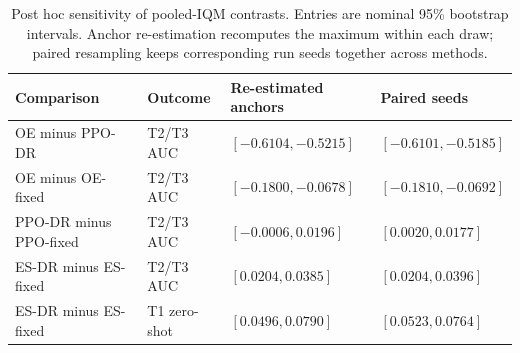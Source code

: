 \begin{table}[tb]
\centering\small
\caption{Post hoc sensitivity of pooled-IQM contrasts. Entries are nominal 95\% bootstrap intervals. Anchor re-estimation recomputes the maximum within each draw; paired resampling keeps corresponding run seeds together across methods.}\label{tab:sensitivity}
\begin{tabularx}{\linewidth}{P{3.4cm}P{2.0cm}P{4.1cm}P{4.1cm}}
\toprule
Comparison & Outcome & Re-estimated anchors & Paired seeds\\\midrule
OE minus PPO-DR & T2/T3 AUC & $[-0.6104,-0.5215]$ & $[-0.6101,-0.5185]$\\
OE minus OE-fixed & T2/T3 AUC & $[-0.1800,-0.0678]$ & $[-0.1810,-0.0692]$\\
PPO-DR minus PPO-fixed & T2/T3 AUC & $[-0.0006,0.0196]$ & $[0.0020,0.0177]$\\
ES-DR minus ES-fixed & T2/T3 AUC & $[0.0204,0.0385]$ & $[0.0204,0.0396]$\\
ES-DR minus ES-fixed & T1 zero-shot & $[0.0496,0.0790]$ & $[0.0523,0.0764]$\\
\bottomrule
\end{tabularx}
\end{table}
